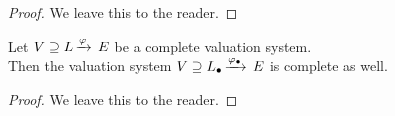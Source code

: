 \documentclass[main.tex]{subfiles}
\begin{document}
\begin{proof}
We leave this to the reader.
\end{proof}
%
%
%
\begin{prop}
\label{P:convexification_versus_completion}
Let $V \supseteq L\,\smash{\xrightarrow{\varphi}\,E}$ be a complete valuation system.\\
Then 
the valuation system 
$V \supseteq L_\bullet\,\smash{\xrightarrow{\varphi_\bullet}\,E}$ is complete as well.
\end{prop}
\begin{proof}
We leave this to the reader.
\end{proof}
\end{document}
